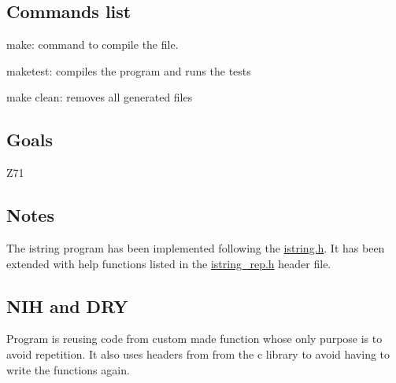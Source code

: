 \subsection*{Commands list }

make\-: command to compile the file. \par
 maketest\-: compiles the program and runs the tests\par
 make clean\-: removes all generated files\par
 \subsection*{Goals }

Z71

\subsection*{Notes }

The istring program has been implemented following the \hyperlink{istring_8h}{istring.\-h}. It has been extended with help functions listed in the \hyperlink{istring__rep_8h}{istring\-\_\-rep.\-h} header file.

\subsection*{N\-I\-H and D\-R\-Y }

Program is reusing code from custom made function whose only purpose is to avoid repetition. It also uses headers from from the c library to avoid having to write the functions again. 